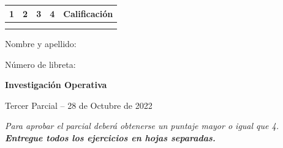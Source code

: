 \documentclass[a4paper,oneside,12pt]{amsart}
\newcommand{\nombremateria}
{Investigaci\'on Operativa}
\newcommand{\numeroparcial}
    { Tercer Parcial }
\newcommand{\fecha}
    {28 de Octubre de 2022}
\theoremstyle{definition}
\begin{document}
\hfill \hfill
\begin{tabular}[c]{|c|c|c|c|c|}
\hline 
1 & 2 & 3 & 4 & Calificaci\'on \\ \hline \hline
\hspace{1.2 cm} & \hspace{1.2 cm} & \hspace{1.2 cm} & \hspace{1.2 cm}  &\hspace{1.5 cm} \\
\hspace{1.2 cm} & \hspace{1.2 cm} & \hspace{1.2 cm} & \hspace{1.2 cm}  &\hspace{1.5 cm} \\ \hline

\end{tabular}

\vspace{-1cm}

\noindent Nombre y apellido:

\vspace{0.2cm}

\noindent Número de libreta:

\noindent \hrulefill 

\smallskip
\renewcommand{\baselinestretch}{1.1}

\begin{center}
	\large \textbf{\nombremateria} 
	
	\numeroparcial -- \fecha
\end{center}

\noindent\textit{Para aprobar el parcial deberá obtenerse un puntaje mayor o igual que 4. \textbf{Entregue todos los ejercicios en hojas separadas.}}

\vspace{.6cm}
\renewcommand{\theenumi}{\textbf{\arabic{enumi}}}

\end{document}
